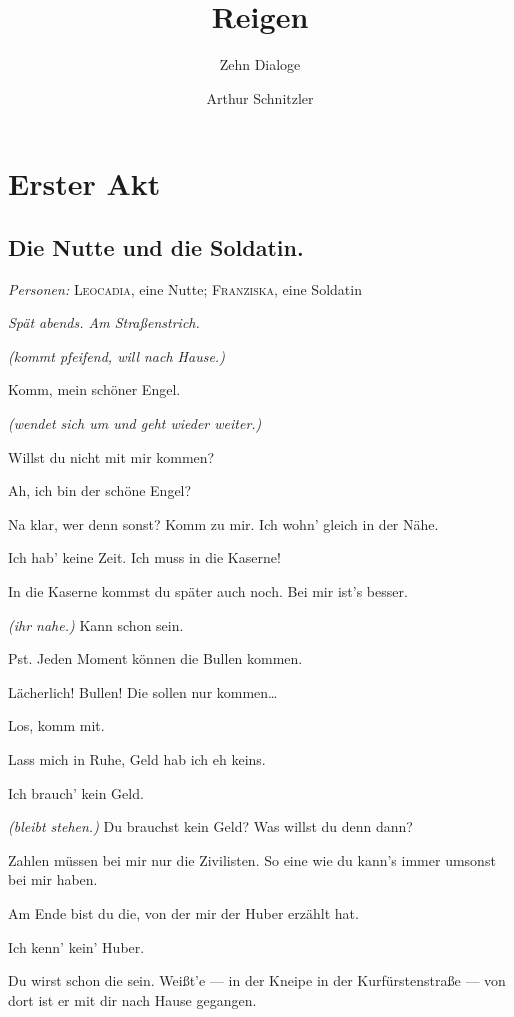 \documentclass[
	final,
	a4paper,
	ngerman,
	mpinclude = true, %
	twoside = true,
	open = right,
	cleardoublepage = plain,
	DIV = 13,
	BCOR = 1cm,
	titlepage = firstiscover,
	]{scrbook}
\title{Reigen}
\subtitle{Zehn Dialoge}
\author{Arthur Schnitzler}
\date{\ifdirectorsversion{--- Regie-Version ---}{}}
\newcommand{\act}{\chapter}
\newcommand{\scene}{\section}
\newcommand{\direction}[1]{\textit{(#1)}}
\newcommand{\setting}[1]{\vspace{-0.5\baselineskip}\centering\textit{#1}}
\newcommand{\characterlist}[1]{{\begin{center}\textit{Personen:} #1\end{center}}}
\newcommand{\thecharacter}[1]{\textup{\textsc{#1}}\xspace}
\newcommand{\thenutte}{\thecharacter{Leocadia}}
\newcommand{\thesoldatin}{\thecharacter{Franziska}}
\newcommand{\character}[1]{\item[#1:]}
\newcommand{\nutte}{\character{\thenutte}}
\newcommand{\soldatin}{\character{\thesoldatin}}
\begin{document}

\cleardoubleoddemptypage

\maketitle

\tableofcontents
\cleardoubleoddpage

\pagestyle{headings}
\doublespacing

\act{Erster Akt}
\scene{Die Nutte und die Soldatin.}
\characterlist{\thenutte, eine Nutte; \thesoldatin, eine Soldatin}
\setting{Spät abends. Am Straßenstrich.}
\begin{play}
	\soldatin
	\direction{kommt pfeifend, will nach Hause.}

	\nutte
	Komm, mein schöner Engel.

	\soldatin
	\direction{wendet sich um und geht wieder weiter.}

	\nutte
	Willst du nicht mit mir kommen?

	\soldatin
	Ah, ich bin der schöne Engel?

	\nutte
	Na klar, wer denn sonst? Komm zu mir. Ich wohn' gleich in der Nähe.

	\soldatin
	Ich hab' keine Zeit. Ich muss in die Kaserne!

	\nutte
	In die Kaserne kommst du später auch noch. Bei mir ist's besser.

	\soldatin
	\direction{ihr nahe.} Kann schon sein.

	\nutte
	Pst. Jeden Moment können die Bullen kommen.

	\soldatin
	Lächerlich! Bullen! Die sollen nur kommen\ldots{}

	\nutte
	Los, komm mit.

	\soldatin
	Lass mich in Ruhe, Geld hab ich eh keins.

	\nutte
	Ich brauch' kein Geld.

	\soldatin
	\direction{bleibt stehen.} Du brauchst kein Geld? Was willst du denn dann?

	\nutte
	Zahlen müssen bei mir nur die Zivilisten. So eine wie du kann's immer umsonst bei mir haben.

	\soldatin
	Am Ende bist du die, von der mir der Huber erzählt hat.

	\nutte
	Ich kenn' kein' Huber.

	\soldatin
	Du wirst schon die sein. Weißt'e --- in der Kneipe in der Kurfürstenstraße --- von dort ist er mit dir nach Hause gegangen.


\end{play}
\end{document}
